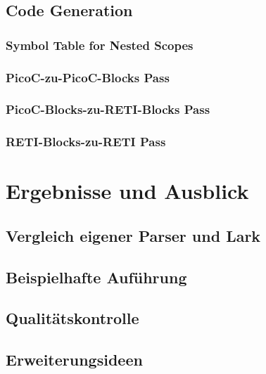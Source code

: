 \documentclass{scrreprt}
\begin{document}
  \section{Code Generation}
  \subsection{Symbol Table for Nested Scopes}
  \subsection{PicoC-zu-PicoC-Blocks Pass}
  \subsection{PicoC-Blocks-zu-RETI-Blocks Pass}
  \subsection{RETI-Blocks-zu-RETI Pass}
  \chapter{Ergebnisse und Ausblick}
  \section{Vergleich eigener Parser und Lark}
  \section{Beispielhafte Auführung}
  \section{Qualitätskontrolle}
  \section{Erweiterungsideen}
  \lipsum
\end{document}
